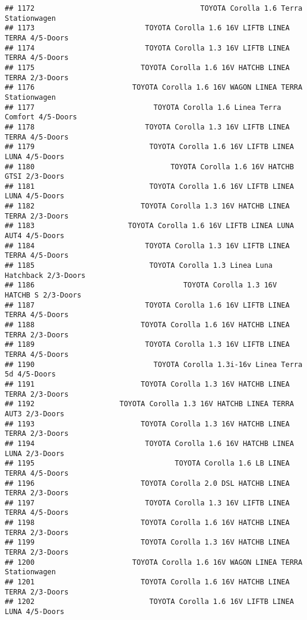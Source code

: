\documentclass[]{article}
\begin{document}
\begin{verbatim}
## 1172                                       TOYOTA Corolla 1.6 Terra Stationwagen
## 1173                          TOYOTA Corolla 1.6 16V LIFTB LINEA TERRA 4/5-Doors
## 1174                          TOYOTA Corolla 1.3 16V LIFTB LINEA TERRA 4/5-Doors
## 1175                         TOYOTA Corolla 1.6 16V HATCHB LINEA TERRA 2/3-Doors
## 1176                       TOYOTA Corolla 1.6 16V WAGON LINEA TERRA Stationwagen
## 1177                            TOYOTA Corolla 1.6 Linea Terra Comfort 4/5-Doors
## 1178                          TOYOTA Corolla 1.3 16V LIFTB LINEA TERRA 4/5-Doors
## 1179                           TOYOTA Corolla 1.6 16V LIFTB LINEA LUNA 4/5-Doors
## 1180                                TOYOTA Corolla 1.6 16V HATCHB GTSI 2/3-Doors
## 1181                           TOYOTA Corolla 1.6 16V LIFTB LINEA LUNA 4/5-Doors
## 1182                         TOYOTA Corolla 1.3 16V HATCHB LINEA TERRA 2/3-Doors
## 1183                      TOYOTA Corolla 1.6 16V LIFTB LINEA LUNA AUT4 4/5-Doors
## 1184                          TOYOTA Corolla 1.3 16V LIFTB LINEA TERRA 4/5-Doors
## 1185                           TOYOTA Corolla 1.3 Linea Luna Hatchback 2/3-Doors
## 1186                                   TOYOTA Corolla 1.3 16V HATCHB S 2/3-Doors
## 1187                          TOYOTA Corolla 1.6 16V LIFTB LINEA TERRA 4/5-Doors
## 1188                         TOYOTA Corolla 1.6 16V HATCHB LINEA TERRA 2/3-Doors
## 1189                          TOYOTA Corolla 1.3 16V LIFTB LINEA TERRA 4/5-Doors
## 1190                            TOYOTA Corolla 1.3i-16v Linea Terra 5d 4/5-Doors
## 1191                         TOYOTA Corolla 1.3 16V HATCHB LINEA TERRA 2/3-Doors
## 1192                    TOYOTA Corolla 1.3 16V HATCHB LINEA TERRA AUT3 2/3-Doors
## 1193                         TOYOTA Corolla 1.3 16V HATCHB LINEA TERRA 2/3-Doors
## 1194                          TOYOTA Corolla 1.6 16V HATCHB LINEA LUNA 2/3-Doors
## 1195                                 TOYOTA Corolla 1.6 LB LINEA TERRA 4/5-Doors
## 1196                         TOYOTA Corolla 2.0 DSL HATCHB LINEA TERRA 2/3-Doors
## 1197                          TOYOTA Corolla 1.3 16V LIFTB LINEA TERRA 4/5-Doors
## 1198                         TOYOTA Corolla 1.6 16V HATCHB LINEA TERRA 2/3-Doors
## 1199                         TOYOTA Corolla 1.3 16V HATCHB LINEA TERRA 2/3-Doors
## 1200                       TOYOTA Corolla 1.6 16V WAGON LINEA TERRA Stationwagen
## 1201                         TOYOTA Corolla 1.6 16V HATCHB LINEA TERRA 2/3-Doors
## 1202                           TOYOTA Corolla 1.6 16V LIFTB LINEA LUNA 4/5-Doors

\end{verbatim}
\end{document}
